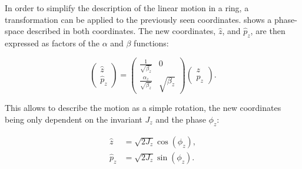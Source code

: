 \subsubsection{}

In order to simplify the description of the linear motion in a ring, a transformation can be applied
to the previously seen coordinates. 
shows a phase-space described in both coordinates. The new coordinates, $\hat{z}$, and $\hat{p}_z$,
are then expressed as factors of the $\alpha$ and $\beta$ functions:

\begin{equation}
    \begin{pmatrix}
        \hat{z}    \\
        \hat{p}_z 
    \end{pmatrix}
    =
    \begin{pmatrix}
        \frac{1}{\sqrt{\beta_z}}         &   0 \\
        \frac{\alpha_z}{\sqrt{\beta_z}}  &   \sqrt{\beta_z}
    \end{pmatrix}
    \begin{pmatrix}
        z \\
        p_z 
    \end{pmatrix}.
\end{equation}

This allows to describe the motion as a simple rotation, the new coordinates being only dependent on
the invariant $J_z$ and the phase $\phi_z$:

\begin{equation}
    \begin{aligned}
        \hat{z}   &= \sqrt{2J_z} \cos \left(\phi_z \right), \\
        \hat{p}_z &= \sqrt{2J_z} \sin \left(\phi_z \right).
    \end{aligned}
\end{equation}     

